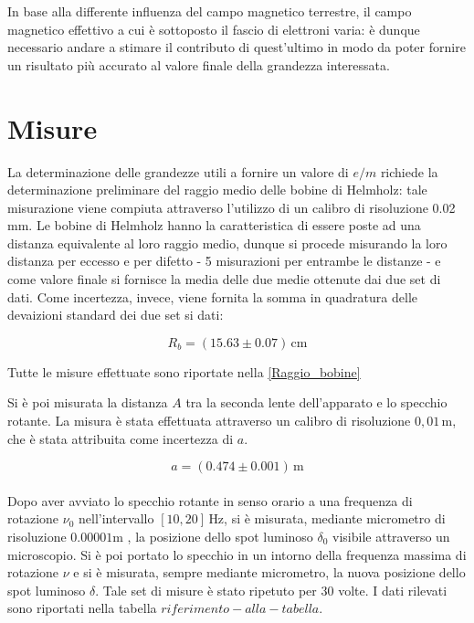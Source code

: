 \documentclass[]{article}
\let\oldsection\section%
\renewcommand{\section}{%
	\renewcommand{\theequation}{\thesection.\arabic{equation}}%
	\oldsection}%
\begin{document}
    In base alla differente influenza del campo magnetico terrestre, il campo magnetico effettivo a cui è sottoposto il fascio di elettroni varia: è dunque necessario andare a stimare il contributo di quest'ultimo in modo da poter fornire un risultato più accurato al valore finale della grandezza interessata.

    \section{Misure}

    La determinazione delle grandezze utili a fornire un valore di $e/m$ richiede la determinazione preliminare del raggio medio delle bobine di Helmholz: tale misurazione viene compiuta attraverso l'utilizzo di un calibro di risoluzione 0.02 mm. Le bobine di Helmholz hanno la caratteristica di essere poste ad una distanza equivalente al loro raggio medio, dunque si procede misurando la loro distanza per eccesso e per difetto - 5 misurazioni per entrambe le distanze - e come valore finale si fornisce la media delle due medie ottenute dai due set di dati. Come incertezza, invece, viene fornita la somma in quadratura delle devaizioni standard dei due set si dati:

    \begin{equation}
        \label{misura_Rb}
        R_b = (15.63 \pm 0.07) \, \text{cm}
    \end{equation} 

    Tutte le misure effettuate sono riportate nella \ref{Raggio_bobine}

    Si è poi misurata la distanza $A$ tra la seconda lente dell'apparato e lo specchio rotante. La misura è stata effettuata
    attraverso un calibro di risoluzione $ 0,01 \, \text{m} $, che è stata attribuita come incertezza di $a$.
    
    \begin{equation}
        \label{equation for a}
        a = (0.474 \pm 0.001) \, \text{m}
    \end{equation} \\
    Dopo aver avviato lo specchio rotante in senso orario a una frequenza di rotazione $ \nu_0 $ nell'intervallo $[10,20] \, \text{Hz}$,
    si è misurata, mediante micrometro di risoluzione $ 0.00001 \text{m} $ , la posizione dello spot luminoso $\delta_0$ visibile attraverso
    un microscopio. Si è poi portato lo specchio in un intorno della frequenza massima di rotazione $ \nu $ e si è misurata,
    sempre mediante micrometro, la nuova posizione dello spot luminoso $\delta$. Tale set di misure è stato ripetuto per $30$ volte.
    I dati rilevati sono riportati nella tabella $ riferimento-alla-tabella $. \\ 
\end{document}
